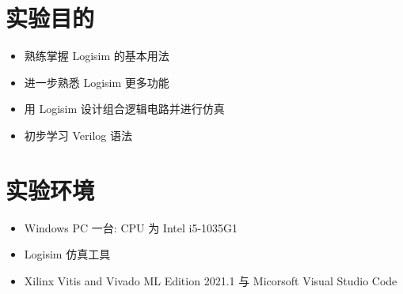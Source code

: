 \documentclass[UTF8,fontset=fandol]{ctexart}
\begin{document}


\section*{实验目的}
\begin{itemize}
  \item 熟练掌握 Logisim 的基本用法
  \item 进一步熟悉 Logisim 更多功能
  \item 用 Logisim 设计组合逻辑电路并进行仿真
  \item 初步学习 Verilog 语法
\end{itemize}


\section*{实验环境}
\begin{itemize}
  \item Windows PC 一台: CPU 为 Intel i5-1035G1
  \item Logisim 仿真工具
  \item Xilinx Vitis and Vivado ML Edition 2021.1 与 Micorsoft Visual Studio Code
\end{itemize}
\end{document}
